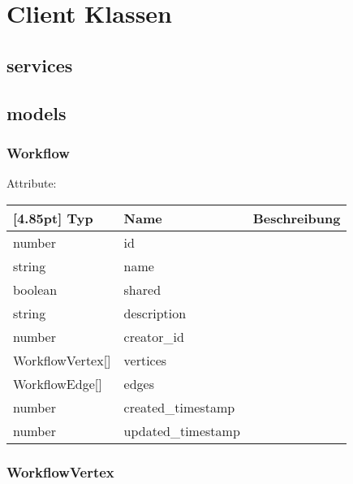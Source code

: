     \section{Client Klassen}
    
        \subsection{services}
    
        \subsection{models}
    
    		\subsubsection{Workflow}
    		
    		Attribute:
                \begin{center}
                	\renewcommand{\arraystretch}{1.5}
    	            \setlength\tabcolsep{5pt}
                	\begin{tabularx}{\textwidth}{|l|l|X|}
                		\hline
                        \rowcolor[gray]{0.75}[4.85pt]	
                	    Typ & Name & Beschreibung \\ \hline
                		number & id &  \\ \hline
                		string & name &  \\ \hline
                		boolean & shared &  \\ \hline
                		string & description &  \\ \hline
                		number & creator_id &  \\ \hline
                		WorkflowVertex[] & vertices &  \\ \hline
                		WorkflowEdge[] & edges &  \\ \hline
                		number & created_timestamp &  \\ \hline
                		number & updated_timestamp &  \\ \hline
                	\end{tabularx}
                \end{center}
                
    		\subsubsection{WorkflowVertex}
    		
